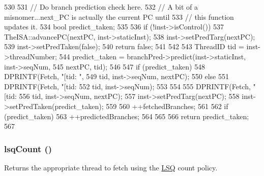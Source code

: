 \begin{DoxyCode}
530 {
531     // Do branch prediction check here.
532     // A bit of a misnomer...next_PC is actually the current PC until
533     // this function updates it.
534     bool predict_taken;
535 
536     if (!inst->isControl()) {
537         TheISA::advancePC(nextPC, inst->staticInst);
538         inst->setPredTarg(nextPC);
539         inst->setPredTaken(false);
540         return false;
541     }
542 
543     ThreadID tid = inst->threadNumber;
544     predict_taken = branchPred->predict(inst->staticInst, inst->seqNum,
545                                         nextPC, tid);
546 
547     if (predict_taken) {
548         DPRINTF(Fetch, "[tid:%
      ",
549                 tid, inst->seqNum, nextPC);
550     } else {
551         DPRINTF(Fetch, "[tid:%
552                 tid, inst->seqNum);
553     }
554 
555     DPRINTF(Fetch, "[tid:%
556             tid, inst->seqNum, nextPC);
557     inst->setPredTarg(nextPC);
558     inst->setPredTaken(predict_taken);
559 
560     ++fetchedBranches;
561 
562     if (predict_taken) {
563         ++predictedBranches;
564     }
565 
566     return predict_taken;
567 }
\end{DoxyCode}
\hypertarget{classDefaultFetch_a2cce05272516009508e173f69d7d37df}{
\subsubsection[{lsqCount}]{ lsqCount ()}}
\label{classDefaultFetch_a2cce05272516009508e173f69d7d37df}
Returns the appropriate thread to fetch using the \hyperlink{classLSQ}{LSQ} count policy. 


